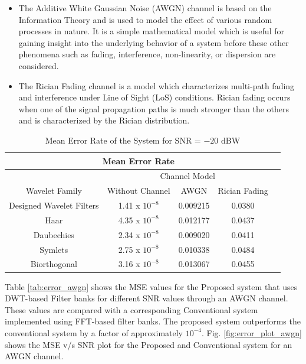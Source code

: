 \begin{itemize}
    \item The Additive White Gaussian Noise (AWGN) channel is based on the Information Theory and is used to model the effect of various random processes in nature. It is a simple mathematical model which is useful for gaining insight into the underlying behavior of a system before these other phenomena such as fading, interference, non-linearity, or dispersion are considered.
    \item The Rician Fading channel is a model which characterizes multi-path fading and interference under Line of Sight (LoS) conditions. Rician fading occurs when one of the signal propagation paths is much stronger than the others and is characterized by the Rician distribution.
\end{itemize}

\begin{table}[hptb]
  \centering
  \begin{tabular}{|c|c|c|c|c|}
  \hline
    \multicolumn{4}{|c|}{Mean Error Rate} \\
    \hline
    & \multicolumn{3}{c|}{Channel Model} \\
    \hline
    Wavelet Family & Without Channel & AWGN & Rician Fading \\
    \hline
    \multicolumn{1}{|c|}{Designed Wavelet Filters} & 1.41 x $10^{-8}$ & 0.009215 & 0.0380 \\
    \hline
    \multicolumn{1}{|c|}{Haar} & 4.35 x $10^{-8}$ & 0.012177 & 0.0437   \\
    \hline
    \multicolumn{1}{|c|}{Daubechies} & 2.34 x $10^{-8}$ & 0.009020 & 0.0411 \\
    \hline
    \multicolumn{1}{|c|}{Symlets} & 2.75 x $10^{-8}$ & 0.010338 & 0.0484  \\
    \hline
    \multicolumn{1}{|c|}{Biorthogonal} & 3.16 x $10^{-8}$ & 0.013067 & 0.0455\\
    \hline
  \end{tabular}
\caption{\label{tab:sim}Mean Error Rate of the System for SNR = $-20$ dBW}
\end{table}

Table \ref{tab:error_awgn} shows the MSE values for the Proposed system that uses DWT-based Filter banks for different SNR values through an AWGN channel. These values are compared with a corresponding Conventional system implemented using FFT-based filter banks. The proposed system outperforms the conventional system by a factor of approximately $10^{-4}$. Fig. \ref{fig:error_plot_awgn} shows the MSE v/s SNR plot for the Proposed and Conventional system for an AWGN channel.

